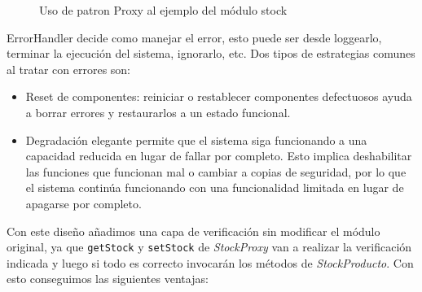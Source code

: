 \begin{figure}[h]
\caption{Uso de patron Proxy al ejemplo del módulo stock}
\begin{center}
\end{center}
\end{figure}
ErrorHandler decide como manejar el error, esto puede ser desde loggearlo, terminar la ejecución del sistema, ignorarlo, etc. Dos tipos de estrategias comunes al tratar con errores son:
\begin{itemize}
    \item Reset de componentes: reiniciar o restablecer componentes defectuosos ayuda a borrar errores y restaurarlos a un estado funcional.
    \item Degradación elegante \cite{glass2009graceful} permite que el sistema siga funcionando a una capacidad reducida en lugar de fallar por completo. Esto implica deshabilitar las funciones que funcionan mal o cambiar a copias de seguridad, por lo que el sistema continúa funcionando con una funcionalidad limitada en lugar de apagarse por completo.
\end{itemize}


Con este diseño añadimos una capa de verificación sin modificar el módulo original, ya que \verb|getStock| y \verb|setStock| de \textit{StockProxy} van a realizar la verificación indicada y luego si todo es correcto invocarán los métodos de \textit{StockProducto}. Con esto conseguimos las siguientes ventajas:

